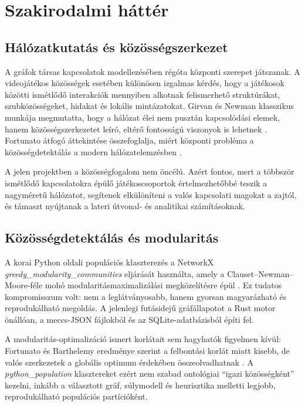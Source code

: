 \chapter{Szakirodalmi háttér}

\section{Hálózatkutatás és közösségszerkezet}

A gráfok társas kapcsolatok modellezésében régóta központi szerepet játszanak. A videojátékos közösségek esetében különösen izgalmas kérdés, hogy a játékosok közötti ismétlődő interakciók mennyiben alkotnak felismerhető struktúrákat, szubközösségeket, hidakat és lokális mintázatokat. Girvan és Newman klasszikus munkája megmutatta, hogy a hálózat élei nem pusztán kapcsolódási elemek, hanem közösségszerkezetet leíró, eltérő fontosságú viszonyok is lehetnek \cite{girvannewman}. Fortunato átfogó áttekintése összefoglalja, miért központi probléma a közösségdetektálás a modern hálózatelemzésben \cite{fortunato2010}.

A jelen projektben a közösségfogalom nem öncélú. Azért fontos, mert a többször ismétlődő kapcsolatokra épülő játékoscsoportok értelmezhetőbbé teszik a nagyméretű hálózatot, segítenek elkülöníteni a valós kapcsolati magokat a zajtól, és támaszt nyújtanak a later\-i útvonal- és analitikai számításoknak.

\section{Közösségdetektálás és modularitás}

A korai Python oldali populációs klaszterezés a NetworkX \textit{greedy\_modularity\_communities} eljárását használta, amely a Clauset--Newman--Moore-féle mohó modularitásmaximalizálási megközelítésre épül \cite{clauset2004,networkx_greedy}. Ez tudatos kompromisszum volt: nem a leglátványosabb, hanem gyorsan magyarázható és reprodukálható megoldás. A jelenlegi futásidejű gráfállapotot a Rust motor önállóan, a meccs-JSON fájlokból és az SQLite-adatbázisból építi fel.

A modularitás-optimalizáció ismert korlátait sem hagyhatók figyelmen kívül: Fortunato és Barthelemy eredménye szerint a felbontási korlát miatt kisebb, de valós szerkezetek a globális optimum érdekében összeolvadhatnak \cite{fortunato_barthelemy2007}. A \textit{python\_population} klasztereket ezért nem szabad ontológiai ``igazi közösségként'' kezelni, inkább a választott gráf, súlymodell és heurisztika melletti legjobb, reprodukálható populációs partícióként.


